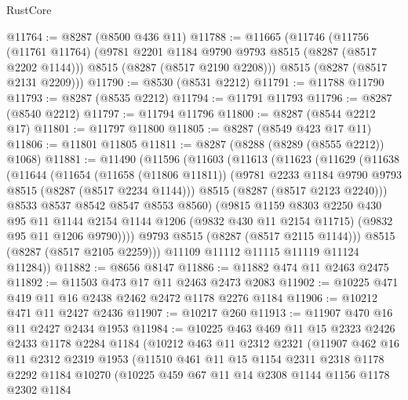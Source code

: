 \begin{lexlean}{RustCore}
\begin{coremodule}
@11764 := @8287 (@8500 @436 @11)
@11788 := @11665
    (@11746
      (@11756
        (@11761 @11764)
        (@9781 @2201 @1184 @9790 @9793 @8515 (@8287 (@8517 @2202 @1144)))
        @8515
        (@8287 (@8517 @2190 @2208)))
      @8515
      (@8287 (@8517 @2131 @2209)))
@11790 := @8530 (@8531 @2212)
@11791 := @11788 @11790
@11793 := @8287 (@8535 @2212)
@11794 := @11791 @11793
@11796 := @8287 (@8540 @2212)
@11797 := @11794 @11796
@11800 := @8287 (@8544 @2212 @17)
@11801 := @11797 @11800
@11805 := @8287 (@8549 @423 @17 @11)
@11806 := @11801 @11805
@11811 := @8287 (@8288 (@8289 (@8555 @2212)) @1068)
@11881 := @11490
    (@11596
      (@11603
        (@11613
          (@11623
            (@11629
              (@11638
                (@11644
                  (@11654
                    (@11658 (@11806 @11811))
                    (@9781 @2233 @1184 @9790 @9793 @8515 (@8287 (@8517 @2234 @1144)))
                    @8515
                    (@8287 (@8517 @2123 @2240)))
                  @8533
                  @8537
                  @8542
                  @8547
                  @8553
                  @8560)
                (@9815
                  @1159
                  @8303
                  @2250
                  @430
                  @95
                  @11
                  @1144
                  @2154
                  @1144
                  @1206
                  (@9832 @430 @11 @2154 @11715)
                  (@9832 @95 @11 @1206 @9790))))
            @9793
            @8515
            (@8287 (@8517 @2115 @1144)))
          @8515
          (@8287 (@8517 @2105 @2259)))
        @11109
        @11112
        @11115
        @11119
        @11124
        @11284))
@11882 := @8656 @8147
@11886 := @11882 @474 @11 @2463 @2475
@11892 := @11503 @473 @17 @11 @2463 @2473 @2083
@11902 := @10225 @471 @419 @11 @16 @2438 @2462 @2472 @1178 @2276 @1184
@11906 := @10212 @471 @11 @2427 @2436
@11907 := @10217 @260
@11913 := @11907 @470 @16 @11 @2427 @2434 @1953
@11984 := @10225
    @463
    @469
    @11
    @15
    @2323
    @2426
    @2433
    @1178
    @2284
    @1184
    (@10212
      @463
      @11
      @2312
      @2321
      (@11907
        @462
        @16
        @11
        @2312
        @2319
        @1953
        (@11510
          @461
          @11
          @15
          @1154
          @2311
          @2318
          @1178
          @2292
          @1184
          @10270
          (@10225
            @459
            @67
            @11
            @14
            @2308
            @1144
            @1156
            @1178
            @2302
            @1184

\end{coremodule}
\end{lexlean}
